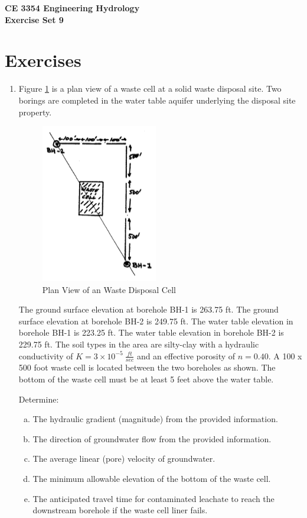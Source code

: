 \documentclass[12pt]{article}
\begin{document}
\begin{center}
{\textbf{{ CE 3354 Engineering Hydrology} \\ {Exercise Set 9}}}
\end{center}

\section*{\small{Exercises}}

\begin{enumerate}
\item Figure \ref{fig:WasteCell} is a plan view of a waste cell at a solid waste disposal site.  Two borings are completed in the water table aquifer underlying the disposal site property. 
\begin{figure}[h!] %
   \centering
   \includegraphics[width=2.0in]{WasteCell.png} 
   \caption{Plan View of an Waste Disposal Cell }
   \label{fig:WasteCell}
\end{figure}

The ground surface elevation at borehole BH-1 is 263.75 ft.  The ground surface elevation at borehole BH-2 is 249.75 ft.  The water table elevation in borehole BH-1 is 223.25 ft.  The water table elevation in borehole BH-2 is 229.75 ft.  The soil types in the area are silty-clay with a 
hydraulic conductivity of $K=3 \times 10^{-5}~\frac{ft}{sec}$ and an effective porosity of $n=0.40$.
A 100 x 500 foot waste cell is located between the two boreholes as shown. The bottom of the waste cell must be at least 5 feet above the water table.

Determine:
    \begin{enumerate}[a)]
        \item The hydraulic gradient (magnitude) from the provided information.
        \item The direction of groundwater flow from the provided information.
        \item The average linear (pore) velocity of groundwater.
        \item The minimum allowable elevation of the bottom of the waste cell.
        \item The anticipated travel time for contaminated leachate to reach the downstream borehole if the waste cell liner fails.
    \end{enumerate}


\end{enumerate}
\end{document}
